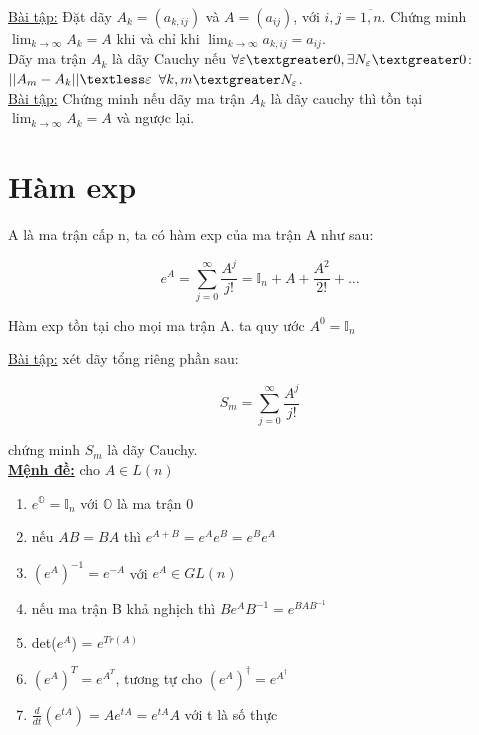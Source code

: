 \documentclass{report}
\begin{document}
\underline{Bài tập:} Đặt dãy \( A_{k} = (a_{k,ij}) \) và \( A = (a_{ij}) \), với \( i,j = \overline{1,n} \). Chứng minh \( \lim_{k \to \infty} A_{k} = A \) khi và chỉ khi \( \lim_{k \to \infty} a_{k,ij} = a_{ij} \).\\

Dãy ma trận \(A_{k} \) là dãy Cauchy nếu  \( \forall \varepsilon \textgreater 0, \exists N_{ \varepsilon } \textgreater 0 \): \( || A_{m} - A_{k} || \textless \varepsilon\) \( \forall k, m \textgreater N_{ \varepsilon} \).\\

\underline{Bài tập:} Chứng minh nếu dãy ma trận \( A_{k} \) là dãy cauchy thì tồn tại \( \lim_{k \to \infty} A_{k} = A \) và ngược lại.

\section{Hàm exp}

A là ma trận cấp n, ta có hàm exp của ma trận A như sau:

	\[ e^{A} = \sum_{j=0}^{ \infty } \frac{A^{j}}{j!} = \mathbb{I}_{n} + A + \frac{A^{2}}{2!} + \dots \]
	
Hàm exp tồn tại cho mọi ma trận A. ta quy ước \(A^{0} = \mathbb{I}_{n} \)

\underline{Bài tập:} xét dãy tổng riêng phần sau:

	\[S_{m} = \sum_{j=0}^{ \infty } \frac{A^{j}}{j!} \]

chứng minh \( S_{m} \) là dãy Cauchy.\\

\textbf{\underline{Mệnh đề:}} cho \( A \in L(n) \)

	\begin{enumerate}
		\item \( e^{\mathbb{O}} = \mathbb{I}_{n} \) với \( \mathbb{O} \) là ma trận 0
		\item nếu \( AB = BA \) thì \( e^{A+B} = e^{A}e^{B} = e^{B}e^{A} \)
		\item \( (e^{A})^{-1} = e^{-A} \) với \( e^{A} \in GL(n) \) 
		\item nếu ma trận B khả nghịch thì \( Be^{A}B^{-1} = e^{BAB^{-1}} \)
		\item det(\( e^{A} \)) = \( e^{Tr(A)} \)
		\item \( (e^{A})^{T} = e^{A^{T}} \), tương tự cho \( (e^{A})^{\dagger} = e^{A^{\dagger}} \)
		\item  \( \frac{d}{dt}(e^{tA}) = Ae^{tA} = e^{tA}A \) với t là số thực
	\end{enumerate}
	
\end{document}
